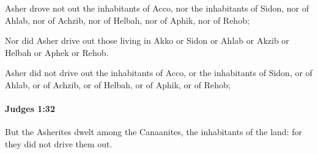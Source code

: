 			\begin{versebox}
					\item[BHS] 
					\item[ASV] Asher drove not out the inhabitants of Acco, nor the inhabitants of Sidon, nor of Ahlab, nor of Achzib, nor of Helbah, nor of Aphik, nor of Rehob;
					\item[NIV] Nor did Asher drive out those living in Akko or Sidon or Ahlab or Akzib or Helbah or Aphek or Rehob.
					\item[NRSV] Asher did not drive out the inhabitants of Acco, or the inhabitants of Sidon, or of Ahlab, or of Achzib, or of Helbah, or of Aphik, or of Rehob;
			\end{versebox}

		\paragraph{Judges 1:32} %
			\label{JUDGES-1-32}

			But the Asherites dwelt among the Canaanites, the inhabitants of the land: for they did not drive them out.

